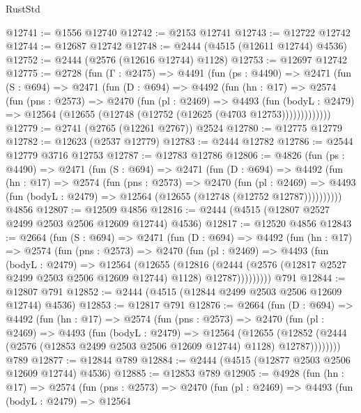 \begin{lexlean}{RustStd}
\begin{coremodule}
@12741 := @1556 @12740
@12742 := @2153 @12741
@12743 := @12722 @12742
@12744 := @12687 @12742
@12748 := @2444 (@4515 (@12611 @12744) @4536)
@12752 := @2444 (@2576 (@12616 @12744) @1128)
@12753 := @12697 @12742
@12775 := @2728
    (fun (Γ : @2475) =>
    @4491
      (fun (ps : @4490) =>
      @2471
        (fun (S : @694) =>
        @2471
          (fun (D : @694) =>
          @4492
            (fun (hn : @17) =>
            @2574
              (fun (pns : @2573) =>
              @2470
                (fun (pl : @2469) =>
                @4493
                  (fun (bodyL : @2479) =>
                  @12564 (@12655 (@12748 (@12752 (@12625 (@4703 @12753)))))))))))))
@12779 := @2741 (@2765 (@12261 @2767)) @2524
@12780 := @12775 @12779
@12782 := @12623 (@2537 @12779)
@12783 := @2444 @12782
@12786 := @2544 @12779 @3716 @12753
@12787 := @12783 @12786
@12806 := @4826
    (fun (ps : @4490) =>
    @2471
      (fun (S : @694) =>
      @2471
        (fun (D : @694) =>
        @4492
          (fun (hn : @17) =>
          @2574
            (fun (pns : @2573) =>
            @2470
              (fun (pl : @2469) =>
              @4493 (fun (bodyL : @2479) => @12564 (@12655 (@12748 (@12752 @12787))))))))))
    @4856
@12807 := @12509 @4856
@12816 := @2444 (@4515 (@12807 @2527 @2499 @2503 @2506 @12609 @12744) @4536)
@12817 := @12520 @4856
@12843 := @2664
    (fun (S : @694) =>
    @2471
      (fun (D : @694) =>
      @4492
        (fun (hn : @17) =>
        @2574
          (fun (pns : @2573) =>
          @2470
            (fun (pl : @2469) =>
            @4493
              (fun (bodyL : @2479) =>
              @12564
                (@12655
                  (@12816
                    (@2444
                      (@2576 (@12817 @2527 @2499 @2503 @2506 @12609 @12744) @1128)
                      @12787)))))))))
    @791
@12844 := @12807 @791
@12852 := @2444 (@4515 (@12844 @2499 @2503 @2506 @12609 @12744) @4536)
@12853 := @12817 @791
@12876 := @2664
    (fun (D : @694) =>
    @4492
      (fun (hn : @17) =>
      @2574
        (fun (pns : @2573) =>
        @2470
          (fun (pl : @2469) =>
          @4493
            (fun (bodyL : @2479) =>
            @12564
              (@12655
                (@12852 (@2444 (@2576 (@12853 @2499 @2503 @2506 @12609 @12744) @1128) @12787))))))))
    @789
@12877 := @12844 @789
@12884 := @2444 (@4515 (@12877 @2503 @2506 @12609 @12744) @4536)
@12885 := @12853 @789
@12905 := @4928
    (fun (hn : @17) =>
    @2574
      (fun (pns : @2573) =>
      @2470
        (fun (pl : @2469) =>
        @4493
          (fun (bodyL : @2479) =>
          @12564

\end{coremodule}
\end{lexlean}
